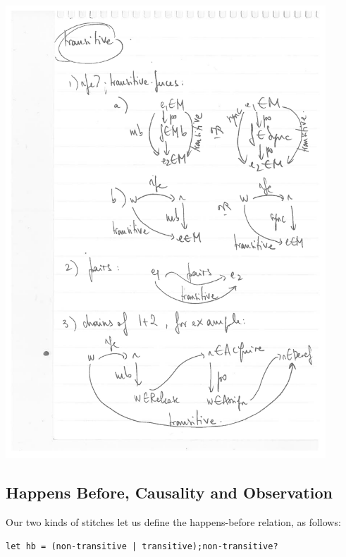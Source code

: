 \documentclass[a4paper]{article}
\begin{document}
\includegraphics[width=12cm]{transitive}

\pagebreak

\subsection{Happens Before, Causality and Observation}

Our two kinds of stitches let us define the happens-before relation, as
follows:
\begin{verbatim}
let hb = (non-transitive | transitive);non-transitive?
\end{verbatim}
\end{document}
